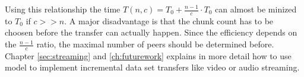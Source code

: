 Using this relationship the time $T(n, c) = T_0 + \frac{n-1}{c} \cdot T_0$ can almost be minized to $T_0$ if $c >> n$. A major disadvantage is that the chunk count has to be choosen before the transfer can actually happen. Since the efficiency depends on the $\frac{n-1}{c}$ ratio, the maximal number of peers should be determined before. Chapter \ref{sec:streaming} and \ref{ch:futurework} explains in more detail how to use model to implement incremental data set transfers like video or audio streaming.



